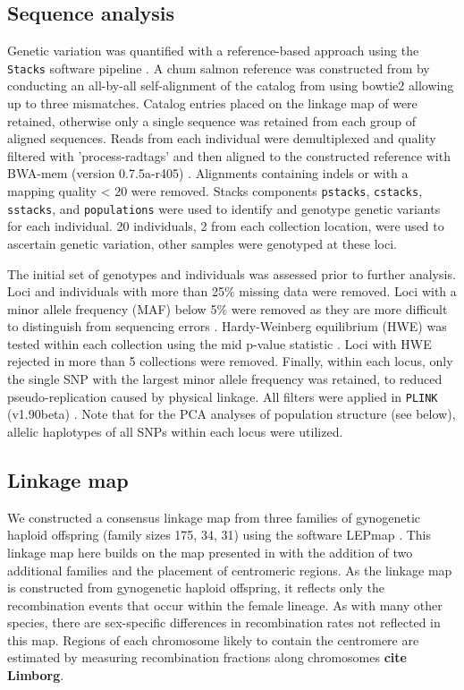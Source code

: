 \documentclass[12pt, one column]{article}
\begin{document}
\subsection*{Sequence analysis}
Genetic variation was quantified with a reference-based approach using the \texttt{Stacks} software pipeline \citep{Catchen2013}.  A chum salmon reference was constructed from by conducting an all-by-all self-alignment of the catalog from \citep{Waples2015} using bowtie2 \citep{Langmead2012} allowing up to three mismatches.  Catalog entries placed on the linkage map of \citet{Waples2015} were retained, otherwise only a single sequence was retained from each group of aligned sequences.  Reads from each individual were demultiplexed and quality filtered with 'process-radtags' and then aligned to the constructed reference with BWA-mem (version 0.7.5a-r405) \citep{Li2013}.  Alignments containing indels or with a mapping quality < 20 were removed. Stacks components \texttt{pstacks}, \texttt{cstacks}, \texttt{sstacks}, and \texttt{populations} were used to identify and genotype genetic variants for each individual. 20 individuals, 2 from each collection location, were used to ascertain genetic variation, other samples were genotyped at these loci.

The initial set of genotypes and individuals was assessed prior to further analysis.  Loci and individuals with more than 25\% missing data were removed.  Loci with a minor allele frequency (MAF) below 5\% were removed as they are more difficult to distinguish from sequencing errors \citep{Nielsen2011} . Hardy-Weinberg equilibrium (HWE) was tested within each collection using the mid p-value statistic \citep{Graffelman2013}. Loci with HWE rejected in more than 5 collections were removed.  Finally, within each locus, only the single SNP with the largest minor allele frequency was retained, to reduced pseudo-replication caused by physical linkage.  All filters were applied in \texttt{PLINK} (v1.90beta) \citep{Chang2014}. Note that for the PCA analyses of population structure (see below), allelic haplotypes of all SNPs within each locus were utilized.

\subsection*{Linkage map}
We constructed a consensus linkage map from three families of gynogenetic haploid offspring (family sizes 175, 34, 31) using the software LEPmap \citep{Rastas2013}. This linkage map here builds on the map presented in \citet{Waples2015} with the addition of two additional families and the placement of centromeric regions. As the linkage map is constructed from gynogenetic haploid offspring, it reflects only the recombination events that occur within the female lineage. As with many other species, there are sex-specific differences in recombination rates not reflected in this map. Regions of each chromosome likely to contain the centromere are estimated by measuring recombination fractions along chromosomes \textbf{cite Limborg}.
\end{document}
